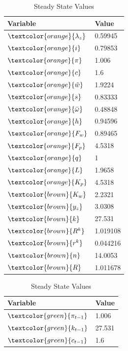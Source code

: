 \FloatBarrier

\newpage

\begin{table}[ht]
\centering
\begin{minipage}[b]{0.45\linewidth}
\centering
\caption{Deterministic solution}
\begin{tabular}{ll}
\toprule
Variable & Value \\
\midrule
$ \textcolor{orange}{\lambda_{z}} $ & 0.59945 \\
$ \textcolor{orange}{i} $ & 0.79853 \\
$ \textcolor{orange}{\pi} $ & 1.006 \\
$ \textcolor{orange}{c} $ & 1.6 \\
$ \textcolor{orange}{\tilde{w}} $ & 1.9224 \\
$ \textcolor{orange}{s} $ & 0.83333 \\
$ \textcolor{orange}{\bar{\omega}} $ & 0.48848 \\
$ \textcolor{orange}{h} $ & 0.94596 \\
$ \textcolor{orange}{F_{w}} $ & 0.89465 \\
$ \textcolor{orange}{F_{p}} $ & 4.5318 \\
$ \textcolor{orange}{q} $ & 1 \\
$ \textcolor{orange}{L} $ & 1.9658 \\
$ \textcolor{orange}{K_{p}} $ & 4.5318 \\
$ \textcolor{brown}{K_{w}} $ & 2.2321 \\
$ \textcolor{brown}{y_{z}} $ & 3.0308 \\
$ \textcolor{brown}{k} $ & 27.531 \\
$ \textcolor{brown}{R^k} $ & 1.019108 \\
$ \textcolor{brown}{r^k} $ & 0.044216 \\
$ \textcolor{brown}{n}  $ & 14.0053 \\
$ \textcolor{brown}{R} $ & 1.011678 \\
\bottomrule
\end{tabular}
\end{minipage}\hfill
\begin{minipage}[b]{0.45\linewidth}
\centering
\caption{Steady State Values}
\begin{tabular}{ll}
\toprule
Variable & Value \\
\midrule
$ \textcolor{green}{\pi_{t-1}} $ &  1.006 \\
$ \textcolor{green}{k_{t-1}} $ & 27.531 \\
$\textcolor{green}{c_{t-1}}$ & 1.6 \\

\end{tabular}
\end{minipage}
\end{table}
